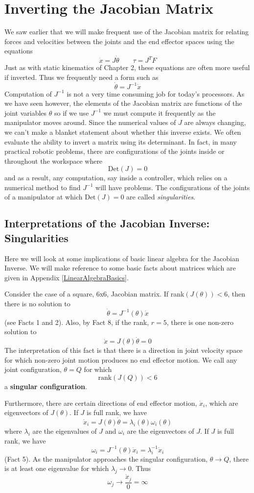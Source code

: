 \section{Inverting the Jacobian Matrix}
We saw earlier that we will make frequent use of the Jacobian matrix for relating forces and velocities between the joints and the end effector spaces using the equations
\[
\dot{x} = J\dot{\theta}  \qquad  \tau = J^TF
\]
Just as with static kinematics of Chapter 2, these equations are often more useful if inverted.  Thus we frequently need a form such as
\[
\dot{\theta} = J^{-1}\dot{x}
\]
Computation of $J^{-1}$ is not a very time consuming job for today's processors.
As we have seen however, the elements of the Jacobian matrix are functions of the joint variables $\theta$ so if we use $J^{-1}$ we must compute it frequently as the manipulator moves around.  Since the numerical values of $J$ are always changing, we can't make a blanket statement about whether this inverse exists.  We often evaluate the ability to invert a matrix using its determinant.   In fact, in many practical robotic problems, there are configurations of the joints inside or throughout the workspace where
\[
\mathrm{Det}({J}) = 0
\]
and as a result, any computation, say inside a controller, which relies on a numerical method to find $J^{-1}$ will have problems.   The configurations of the joints of a manipulator at which $\mathrm{Det}({J}) = 0$ are called {\it singularities}.


\subsection{Interpretations of the Jacobian Inverse: Singularities}
Here we will look at some implications of basic linear algebra for the Jacobian Inverse.
We will make reference to some basic facts about matrices which are given in Appendix \ref{LinearAlgebraBasics}.

Consider the case of a square, 6x6, Jacobian matrix.  If rank$(J(\theta)) < 6$, then there is no solution to
\[
\dot{\theta} = J^{-1}(\theta)\dot{x}
\]
(see Facts 1 and 2).   Also,
by Fact 8, if the rank, $r=5$, there is one non-zero solution to
\[
\dot{x} = J(\theta)\dot{\theta} = 0
\]
The interpretation of this fact is that there is a direction in joint velocity space for which non-zero joint motion produces no end effector motion.
We call any joint configuration, $\theta = Q$ for which
\[
\mathrm{rank}(J(Q)) < 6
\]
a {\bf singular configuration}.

Furthermore, there are certain directions of end effector motion, $\dot{x}_i$, which are eigenvectors of $J(\theta)$. If $J$ is full rank, we have
\[
\dot{x}_i = J(\theta)\dot{\theta} = \lambda_i(\theta) \omega_i(\theta)
\]
where $\lambda_i$ are the eigenvalues of $J$ and $\omega_i$ are the eigenvectors of $J$. If $J$ is full rank, we have
\[
\omega_i = J^{-1}(\theta)\dot{x}_i = \lambda^{-1}_i\dot{x}_i
\]
(Fact 5).
As the manipulator approaches the singular configuration, $\theta \to Q$, there is at least one eigenvalue for which $\lambda_j \to 0$.  Thus
\[
\omega_j \to \frac{\dot{x}_j}{0} = \infty
\]

